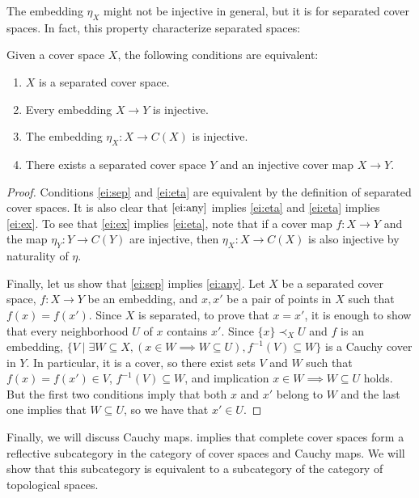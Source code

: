 \documentclass[reqno]{amsart}
\theoremstyle{definition}
\theoremstyle{remark}
\numberwithin{figure}{section}
\newcommand{\rb}{\prec}
\begin{document}
The embedding $\eta_X$ might not be injective in general, but it is for separated cover spaces.
In fact, this property characterize separated spaces:

\begin{prop}
Given a cover space $X$, the following conditions are equivalent:
\begin{enumerate}
\item \label{ei:sep} $X$ is a separated cover space.
\item \label{ei:any} Every embedding $X \to Y$ is injective.
\item \label{ei:eta} The embedding $\eta_X : X \to C(X)$ is injective.
\item \label{ei:ex} There exists a separated cover space $Y$ and an injective cover map $X \to Y$.
\end{enumerate}
\end{prop}
\begin{proof}
Conditions \eqref{ei:sep} and \eqref{ei:eta} are equivalent by the definition of separated cover spaces.
It is also clear that $\eqref{ei:any}$ implies \eqref{ei:eta} and \eqref{ei:eta} implies \eqref{ei:ex}.
To see that \eqref{ei:ex} implies \eqref{ei:eta}, note that if a cover map $f : X \to Y$ and the map $\eta_Y : Y \to C(Y)$ are injective,
then $\eta_X : X \to C(X)$ is also injective by naturality of $\eta$.

Finally, let us show that \eqref{ei:sep} implies \eqref{ei:any}.
Let $X$ be a separated cover space, $f : X \to Y$ be an embedding, and $x,x'$ be a pair of points in $X$ such that $f(x) = f(x')$.
Since $X$ is separated, to prove that $x = x'$, it is enough to show that every neighborhood $U$ of $x$ contains $x'$.
Since $\{ x \} \rb_X U$ and $f$ is an embedding, $\{ V \mid \exists W \subseteq X, (x \in W \implies W \subseteq U), f^{-1}(V) \subseteq W \}$ is a Cauchy cover in $Y$.
In particular, it is a cover, so there exist sets $V$ and $W$ such that $f(x) = f(x') \in V$, $f^{-1}(V) \subseteq W$, and implication $x \in W \implies W \subseteq U$ holds.
But the first two conditions imply that both $x$ and $x'$ belong to $W$ and the last one implies that $W \subseteq U$, so we have that $x' \in U$.
\end{proof}

Finally, we will discuss Cauchy maps.
 implies that complete cover spaces form a reflective subcategory in the category of cover spaces and Cauchy maps.
We will show that this subcategory is equivalent to a subcategory of the category of topological spaces.
\end{document}
